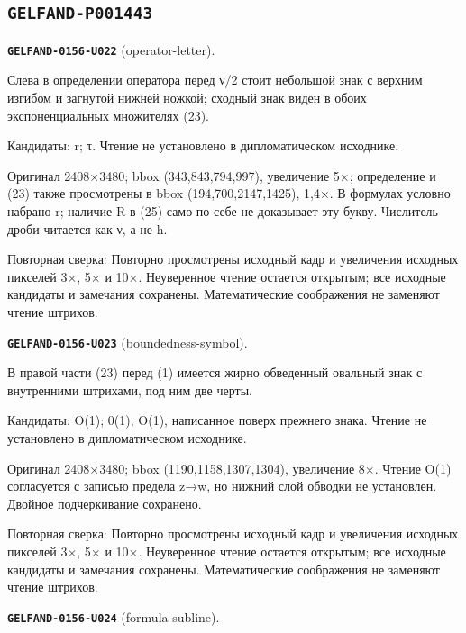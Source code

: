 \subsection*{\texttt{GELFAND-P001443}}
\par\noindent\leavevmode{}\label{GELFAND-0156-U022}\label{GELFAND-P001443:operator-letter}\textbf{\texttt{GELFAND-0156-U022}} (operator-letter).\nopagebreak[4]\par
Слева в определении оператора перед ν/2 стоит небольшой знак с верхним изгибом и загнутой нижней ножкой; сходный знак виден в обоих экспоненциальных множителях (23).\par
Кандидаты: r; τ. Чтение не установлено в дипломатическом исходнике.\par
Оригинал 2408×3480; bbox (343,843,794,997), увеличение 5×; определение и (23) также просмотрены в bbox (194,700,2147,1425), 1,4×. В формулах условно набрано r; наличие R в (25) само по себе не доказывает эту букву. Числитель дроби читается как ν, а не h.\par
Повторная сверка: Повторно просмотрены исходный кадр и увеличения исходных пикселей 3×, 5× и 10×. Неуверенное чтение остается открытым; все исходные кандидаты и замечания сохранены. Математические соображения не заменяют чтение штрихов.\par\medskip
\par\noindent\leavevmode{}\label{GELFAND-0156-U023}\label{GELFAND-P001443:boundedness-symbol}\textbf{\texttt{GELFAND-0156-U023}} (boundedness-symbol).\nopagebreak[4]\par
В правой части (23) перед (1) имеется жирно обведенный овальный знак с внутренними штрихами, под ним две черты.\par
Кандидаты: O(1); 0(1); O(1), написанное поверх прежнего знака. Чтение не установлено в дипломатическом исходнике.\par
Оригинал 2408×3480; bbox (1190,1158,1307,1304), увеличение 8×. Чтение O(1) согласуется с записью предела z→w, но нижний слой обводки не установлен. Двойное подчеркивание сохранено.\par
Повторная сверка: Повторно просмотрены исходный кадр и увеличения исходных пикселей 3×, 5× и 10×. Неуверенное чтение остается открытым; все исходные кандидаты и замечания сохранены. Математические соображения не заменяют чтение штрихов.\par\medskip
\par\noindent\leavevmode{}\label{GELFAND-0156-U024}\label{GELFAND-P001443:formula-subline}\textbf{\texttt{GELFAND-0156-U024}} (formula-subline).\nopagebreak[4]\par

